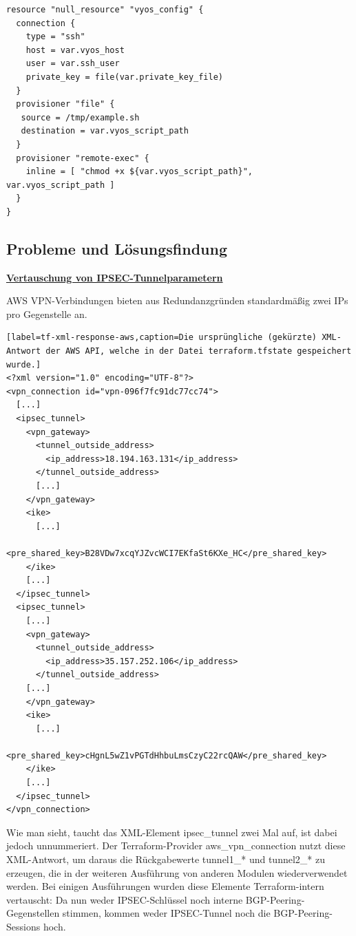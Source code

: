 \begin{lstlisting}[label=tf-generate-psk,caption=Das so generierte Shell-Skript wird per SSH auf das Zielsystem (VyOS-Router) hochgeladen und per provisioner remote-exec ausgeführt.]
resource "null_resource" "vyos_config" {
  connection {
    type = "ssh"
    host = var.vyos_host
    user = var.ssh_user
    private_key = file(var.private_key_file)
  }
  provisioner "file" {
   source = /tmp/example.sh
   destination = var.vyos_script_path
  }
  provisioner "remote-exec" {
    inline = [ "chmod +x ${var.vyos_script_path}", var.vyos_script_path ]
  }
}
\end{lstlisting}

\newpage
\subsection{Probleme und Lösungsfindung}

\textbf{\underline{Vertauschung von IPSEC-Tunnelparametern}}

AWS VPN-Verbindungen bieten aus Redundanzgründen standardmäßig zwei IPs pro Gegenstelle an. 

\begin{lstlisting}[label=tf-xml-response-aws,caption=Die ursprüngliche (gekürzte) XML-Antwort der AWS API, welche in der Datei terraform.tfstate gespeichert wurde.]
<?xml version="1.0" encoding="UTF-8"?>
<vpn_connection id="vpn-096f7fc91dc77cc74">
  [...]
  <ipsec_tunnel>
    <vpn_gateway>
      <tunnel_outside_address>
        <ip_address>18.194.163.131</ip_address>
      </tunnel_outside_address>
      [...]
    </vpn_gateway>
    <ike>
      [...]
      <pre_shared_key>B28VDw7xcqYJZvcWCI7EKfaSt6KXe_HC</pre_shared_key>
    </ike>
    [...]
  </ipsec_tunnel>
  <ipsec_tunnel>
    [...]
    <vpn_gateway>
      <tunnel_outside_address>
        <ip_address>35.157.252.106</ip_address>
      </tunnel_outside_address>
    [...]
    </vpn_gateway>
    <ike>
      [...]
      <pre_shared_key>cHgnL5wZ1vPGTdHhbuLmsCzyC22rcQAW</pre_shared_key>
    </ike>
    [...]
  </ipsec_tunnel>
</vpn_connection>

\end{lstlisting}

Wie man sieht, taucht das XML-Element ipsec\_tunnel zwei Mal auf, ist dabei jedoch unnummeriert.
Der Terraform-Provider aws\_vpn\_connection nutzt diese XML-Antwort, um daraus die Rückgabewerte tunnel1\_* und tunnel2\_* zu erzeugen, die in der weiteren Ausführung von anderen Modulen wiederverwendet werden. Bei einigen Ausführungen wurden diese Elemente Terraform-intern vertauscht: Da nun weder IPSEC-Schlüssel noch interne BGP-Peering-Gegenstellen stimmen, kommen weder IPSEC-Tunnel noch die BGP-Peering-Sessions hoch.

